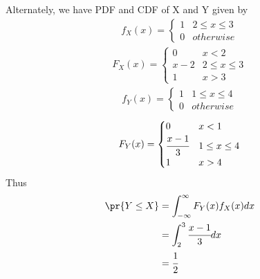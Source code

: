 Alternately, we have PDF and CDF of X and Y given by 
\begin{align}
    f_X(x) = 
    \begin{cases}
    1 & 2\le x\le 3\\
    0 & otherwise
    \end{cases}
\end{align}
\begin{align}
    F_X(x) = 
    \begin{cases}
    0   & x < 2\\
    x-2 & 2\le x\le 3\\
    1   & x > 3
    \end{cases}
\end{align}
\begin{align}
    f_Y(x) = 
    \begin{cases}
    1 & 1\le x\le 4\\
    0 & otherwise
    \end{cases}
\end{align}
\begin{align}
    F_Y(x) = 
    \begin{cases}
    0   & x < 1\\
    \cfrac{x-1}{3} & 1\le x\le 4\\
    1   & x > 4
    \end{cases}
\end{align}
Thus 
\begin{align}
    \pr{Y\le X} &= \int_{-\infty}^{\infty} F_Y(x)f_X(x)dx\\
                &= \int_2^3 \cfrac{x-1}{3}dx\\
                &= \cfrac{1}{2}
\end{align}


